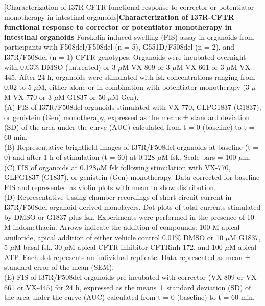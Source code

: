 [Characterization of I37R-CFTR functional response to corrector or potentiator monotherapy in intestinal organoids]{\textbf{Characterization of I37R-CFTR functional response to corrector or potentiator monotherapy in intestinal organoids}}{
Forskolin-induced swelling (FIS) assay in organoids from participants with F508del/F508del (n = 5), G551D/F508del (n = 2), and I37R/F508del (n = 1) CFTR genotypes. Organoids were incubated overnight with 0.03\% DMSO (untreated) or 3 $\mu$M VX-809 or 3 $\mu$M VX-661 or 3 $\mu$M VX-445. After 24 h, organoids were stimulated with fsk concentrations ranging from 0.02 to 5 $\mu$M, either alone or in combination with potentiator monotherapy (3 $\mu$M VX-770 or 3 $\mu$M G1837 or 50 $\mu$M Gen).\\

(A) FIS of I37R/F508del organoids stimulated with VX-770, GLPG1837 (G1837), or genistein (Gen) monotherapy, expressed as the means ± standard deviation (SD) of the area under the curve (AUC) calculated from t = 0 (baseline) to t = 60 min.\\

(B) Representative brightfield images of I37R/F508del organoids at baseline (t = 0) and after 1 h of stimulation (t = 60) at 0.128 $\mu$M fsk. Scale bars = 100 $\mu$m.\\

(C) FIS of organoids at 0.128$\mu$M fsk following stimulation with VX-770, GLPG1837 (G1837), or genistein (Gen) monotherapy. Data corrected for baseline FIS and represented as violin plots with mean to show distribution.\\

(D) Representative Ussing chamber recordings of short circuit current in I37R/F508del organoid-derived monolayers. Dot plots of total currents stimulated by DMSO or G1837 plus fsk. Experiments were performed in the presence of 10 M indomethacin. Arrows indicate the addition of compounds: 100 M apical amiloride, apical addition of either vehicle control 0.01\% DMSO or 10 $\mu$M G1837, 5 $\mu$M basal fsk, 30 $\mu$M apical CFTR inhibitor CFTRinh-172, and 100 $\mu$M apical ATP. Each dot represents an individual replicate. Data represented as mean ± standard error of the mean (SEM).\\

(E) FIS of I37R/F508del organoids pre-incubated with corrector (VX-809 or VX-661 or VX-445) for 24 h, expressed as the means ± standard deviation (SD) of the area under the curve (AUC) calculated from t = 0 (baseline) to t = 60 min.\\

}
